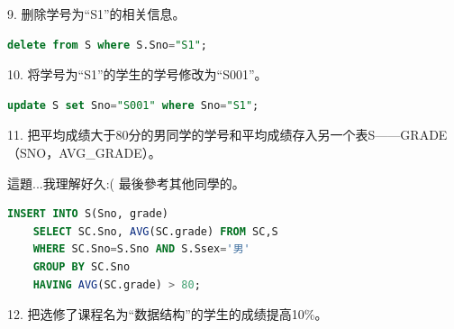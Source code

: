\documentclass[12pt, a4paper]{report}
\begin{document}
9. 删除学号为“S1”的相关信息。\\

\begin{lstlisting}[language=SQL]
    delete from S where S.Sno="S1";
\end{lstlisting}

\begin{figure}[H] %
    \centering %
\end{figure}
10. 将学号为“S1”的学生的学号修改为“S001”。\\

\begin{lstlisting}[language=SQL]
    update S set Sno="S001" where Sno="S1";
\end{lstlisting}

\begin{figure}[H] %
    \centering %
\end{figure}

11. 把平均成绩大于80分的男同学的学号和平均成绩存入另一个表S——GRADE（SNO，AVG\_GRADE）。

這題...我理解好久:( 最後參考其他同學的。\\

\begin{lstlisting}[language=SQL]
    INSERT INTO S(Sno, grade)
    SELECT SC.Sno, AVG(SC.grade) FROM SC,S 
    WHERE SC.Sno=S.Sno AND S.Ssex='男' 
    GROUP BY SC.Sno
    HAVING AVG(SC.grade) > 80;
\end{lstlisting}

12. 把选修了课程名为“数据结构”的学生的成绩提高10\%。\\
\end{document}
